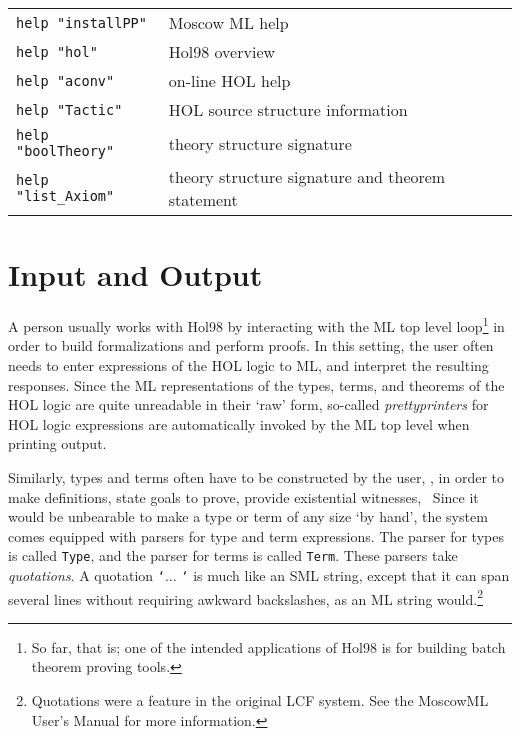 \documentclass[12pt,fleqn,a4paper]{report}
\begin{document}
 \begin{table}[h]
\begin{center}
 \begin{tabular}{|l|l|} \hline
  \verb+help "installPP"+ & Moscow ML help \\
  \verb+help "hol"+ &  Hol98 overview \\
  \verb+help "aconv"+ &  on-line HOL help \\
  \verb+help "Tactic"+ & HOL source structure information \\
  \verb+help "boolTheory"+ &  theory structure signature \\
  \verb+help "list_Axiom"+ & theory structure signature and theorem
 statement \\ \hline
 \end{tabular}
\end{center}
 \end{table}

\section{Input and Output}

A person usually works with Hol98  by interacting with the ML top level
loop\footnote{So far, that is; one of the intended applications of Hol98
is for building batch theorem proving tools.} in order to build
formalizations and perform proofs. In this setting, the user often needs
to enter expressions of the HOL logic to ML, and interpret the resulting
responses. Since the ML representations of the types, terms, and
theorems of the HOL logic are quite unreadable in their `raw' form,
so-called {\it prettyprinters\/} for HOL logic expressions are
automatically invoked by the ML top level when printing output.

Similarly, types and terms often have to be constructed by the user,
\eg, in order to make definitions, state goals to prove, provide
existential witnesses, \etc\ Since it would be unbearable to make a type
or term of any size `by hand', the system comes equipped with parsers
for type and term expressions. The parser for types is called
\verb+Type+, and the parser for terms is called \verb+Term+. These
parsers take {\it quotations\/}.  A quotation {\tt `}$\ldots$ {\tt `} is
much like an SML string, except that it can span several lines without
requiring awkward backslashes, as an ML string
would.\footnote{Quotations were a feature in the original LCF
system. See the MoscowML User's Manual for more information.}
\end{document}
